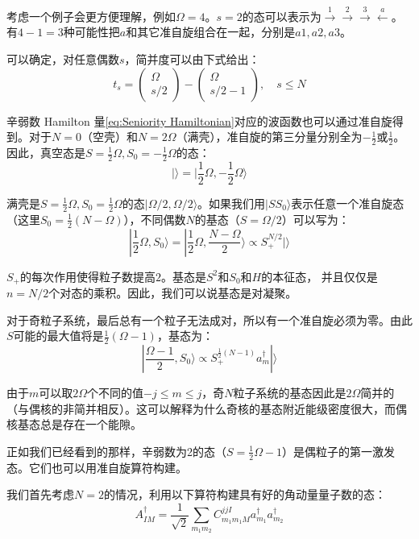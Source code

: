 考虑一个例子会更方便理解，例如$\Omega=4$。$s=2$的态可以表示为$\overset{1}{\rightarrow}\overset{2}{\rightarrow}\overset{3}{\rightarrow}\overset{a}{\leftarrow}$。有$4-1=3$种可能性把$a$和其它准自旋组合在一起，分别是$a1,a2,a3$。

可以确定，对任意偶数$s$，简并度可以由下式给出\cite{BS68a}：
\[
t_{s}=\begin{pmatrix}\Omega\\
s/2
\end{pmatrix}-\begin{pmatrix}\Omega\\
s/2-1
\end{pmatrix},\quad s\leq N
\]

辛弱数 Hamilton 量\ref{eq:Seniority Hamiltonian}对应的波函数也可以通过准自旋得到。对于$N=0$（空壳）和$N=2\Omega$（满壳），准自旋的第三分量分别全为$-\frac{1}{2}$或$\frac{1}{2}$。因此，真空态是$S=\frac{1}{2}\Omega,S_{0}=-\frac{1}{2}\Omega$的态：
\[
|\rangle=|\frac{1}{2}\Omega,-\frac{1}{2}\Omega\rangle
\]

满壳是$S=\frac{1}{2}\Omega,S_{0}=\frac{1}{2}\Omega$的态$|\Omega/2,\Omega/2\rangle$。如果我们用$|SS_{0}\rangle$表示任意一个准自旋态（这里$S_{0}=\frac{1}{2}(N-\Omega)$），不同偶数$N$的基态（$S=\Omega/2$）可以写为：
\begin{equation}
|\frac{1}{2}\Omega,S_{0}\rangle=|\frac{1}{2}\Omega,\frac{N-\Omega}{2}\rangle\propto S^{N/2}_{+}|\rangle\label{eq:ground state of seniority model}
\end{equation}

$S_{+}$的每次作用使得粒子数提高$2$。基态是$S^{2}$和$S_{0}$和$H$的本征态， 并且仅仅是$n=N/2$个对态的乘积。因此，我们可以说基态是对凝聚。

对于奇粒子系统，最后总有一个粒子无法成对，所以有一个准自旋必须为零。由此$S$可能的最大值将是$\frac{1}{2}(\Omega-1)$，基态为：
\[
|\frac{\Omega-1}{2},S_{0}\rangle\propto S^{\frac{1}{2}(N-1)}_{+}a^{\dagger}_{m}|\rangle
\]

由于$m$可以取$2\Omega$个不同的值$-j\leq m\leq j$，奇$N$粒子系统的基态因此是$2\Omega$简并的（与偶核的非简并相反）。这可以解释为什么奇核的基态附近能级密度很大，而偶核基态总是存在一个能隙。

正如我们已经看到的那样，辛弱数为2的态（$S=\frac{1}{2}\Omega-1$）是偶粒子的第一激发态。它们也可以用准自旋算符构建。

我们首先考虑$N=2$的情况，利用以下算符构建具有好的角动量量子数的态：
\[
A^{\dagger}_{IM}=\frac{1}{\sqrt{2}}\sum_{m_{1}m_{2}}C^{jjI}_{m_{1}m_{1}M}a^{\dagger}_{m_{1}}a^{\dagger}_{m_{2}}
\]

